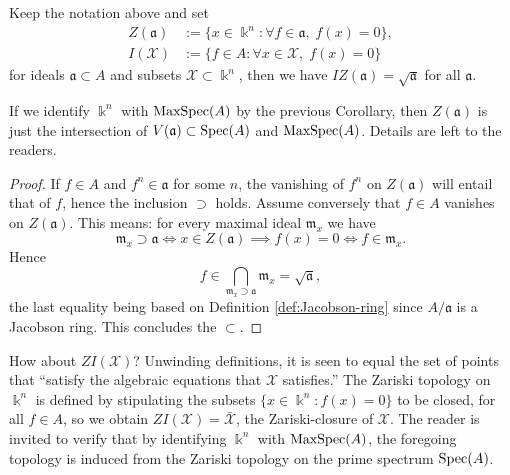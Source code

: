 \begin{corollary}
	Keep the notation above and set
	\begin{align*}
		Z(\mathfrak{a}) & := \{x \in \Bbbk^n: \forall f \in \mathfrak{a}, \; f(x)=0 \}, \\
		I(\mathcal{X}) & := \{f \in A: \forall x \in \mathcal{X}, \; f(x)=0 \}
	\end{align*}
	for ideals $\mathfrak{a} \subset A$ and subsets $\mathcal{X} \subset \Bbbk^n$, then we have $IZ(\mathfrak{a}) = \sqrt{\mathfrak{a}}$ for all $\mathfrak{a}$.		
\end{corollary}
If we identify $\Bbbk^n$ with $\operatorname{MaxSpec}(A)$ by the previous Corollary, then $Z(\mathfrak{a})$ is just the intersection of $V(\mathfrak{a}) \subset \operatorname{Spec}(A)$ and $\operatorname{MaxSpec}(A)$. Details are left to the readers.
\begin{proof}
	If $f \in A$ and $f^n \in \mathfrak{a}$ for some $n$, the vanishing of $f^n$ on $Z(\mathfrak{a})$ will entail that of $f$, hence the inclusion $\supset$ holds. Assume conversely that $f \in A$ vanishes on $Z(\mathfrak{a})$. This means: for every maximal ideal $\mathfrak{m}_x$ we have
	\[ \mathfrak{m}_x \supset \mathfrak{a} \iff x \in Z(\mathfrak{a}) \implies f(x)=0 \iff f \in \mathfrak{m}_x. \]
	Hence
	\[ f \in \bigcap_{\mathfrak{m}_x \supset \mathfrak{a}} \mathfrak{m}_x = \sqrt{\mathfrak{a}}, \]
	the last equality being based on Definition \ref{def:Jacobson-ring} since $A/\mathfrak{a}$ is a Jacobson ring. This concludes the $\subset$.
\end{proof}

\begin{remark}
	How about $Z I(\mathcal{X})$? Unwinding definitions, it is seen to equal the set of points that ``satisfy the algebraic equations that $\mathcal{X}$ satisfies.'' The Zariski topology on $\Bbbk^n$ is defined by stipulating the subsets $\{ x \in \Bbbk^n: f(x)=0 \}$ to be closed, for all $f \in A$, so we obtain $ZI(\mathcal{X}) = \bar{\mathcal{X}}$, the Zariski-closure of $\mathcal{X}$. The reader is invited to verify that by identifying $\Bbbk^n$ with $\operatorname{MaxSpec}(A)$, the foregoing topology is induced from the Zariski topology on the prime spectrum $\operatorname{Spec}(A)$.
\end{remark}


